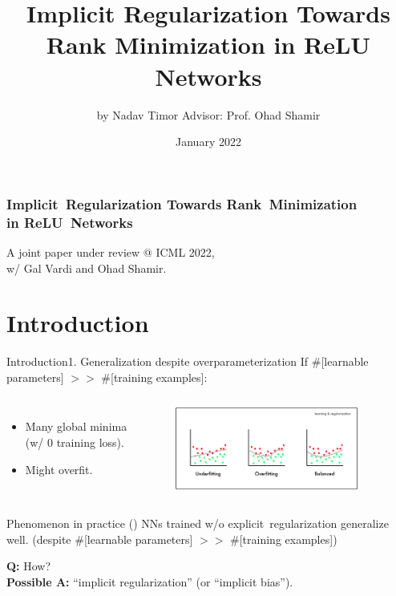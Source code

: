 \documentclass{beamer}
\title[Implicit Bias: Rank Min. in ReLU Networks]{Implicit Regularization Towards Rank Minimization in ReLU Networks}
\author[Nadav Timor]{
    by Nadav Timor\newline
    Advisor: Prof. Ohad Shamir
}
\institute[Weizmann Institute]{Weizmann Institute of Science}
\date[January 2022]{January 2022}
\begin{document}
\frame{\titlepage}

\begin{frame}
    \frametitle{Implicit~Regularization Towards Rank~Minimization\\in ReLU~Networks}
    A joint paper under review @ ICML 2022,\\
    w/ Gal Vardi and Ohad Shamir.
\end{frame}



\section{Introduction}

\begin{frame}{Introduction}{1. Generalization despite overparameterization}
    \newline
    If \#[learnable parameters] $>>$ \#[training examples]:
    \pause
    \begin{columns}
        \begin{itemize}
            \item Many global minima\\
            (w/ $0$ training loss). 
            \pause
            \item Might overfit.
        \end{itemize}
        \begin{figure}
        \centering
            \includegraphics[width=6cm]{figures/overfitting.png}
        \end{figure}
    \end{columns}
    \pause
    \begin{block}{Phenomenon in practice (\cite{zhang2017understanding})}
        NNs trained \alert{w/o explicit~regularization} generalize well.
        \newline
        \newline
        (despite \#[learnable parameters] $>>$ \#[training examples])
    \end{block}
    \pause
    \textbf{Q:} How?\\
    \pause
    \textbf{Possible A:} ``implicit regularization'' (or ``implicit bias'').
    

\end{frame}
\end{document}
